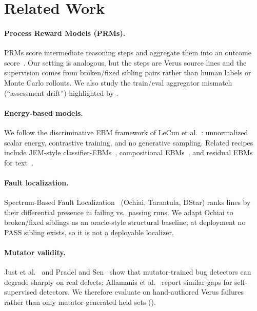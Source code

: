 \documentclass[10pt]{article}
\begin{document}
\section{Related Work}
\label{sec:related}

\paragraph{Process Reward Models (PRMs).}
PRMs score intermediate reasoning steps and aggregate them into an
outcome score~\cite{lightman2023letsverify,wang2024mathshepherd,setlur2024processadvantage,cobbe2021verifiers}.
Our setting is analogous, but the steps are Verus source lines and
the supervision comes from broken/fixed sibling pairs rather than
human labels or Monte Carlo rollouts. We also study the train/eval
aggregator mismatch (``assessment drift'') highlighted by
\cite{zhang2025lessonsprm}.

\paragraph{Energy-based models.}
We follow the discriminative EBM framework of
LeCun et al.~\cite{lecun2006tutorial}: unnormalized scalar energy,
contrastive training, and no generative sampling. Related recipes
include JEM-style classifier-EBMs~\cite{grathwohl2020jem},
compositional EBMs~\cite{du2019ebm}, and residual EBMs for
text~\cite{bakhtin2021residual}.

\paragraph{Fault localization.}
Spectrum-Based Fault Localization~\cite{abreu2007ochiai} (Ochiai, Tarantula,
DStar) ranks lines by their differential presence in failing vs.\ passing
runs. We adapt Ochiai to broken/fixed siblings as an oracle-style
structural baseline; at deployment no PASS sibling exists, so it is
not a deployable localizer.

\paragraph{Mutator validity.}
Just et al.~\cite{just2014mutants} and Pradel and Sen~\cite{pradel2018deepbugs}
show that mutator-trained bug detectors can degrade sharply on real
defects; Allamanis et al.~\cite{allamanis2021ssbd} report similar
gaps for self-supervised detectors. We therefore evaluate on
hand-authored Verus failures rather than only mutator-generated held
sets ().
\end{document}
